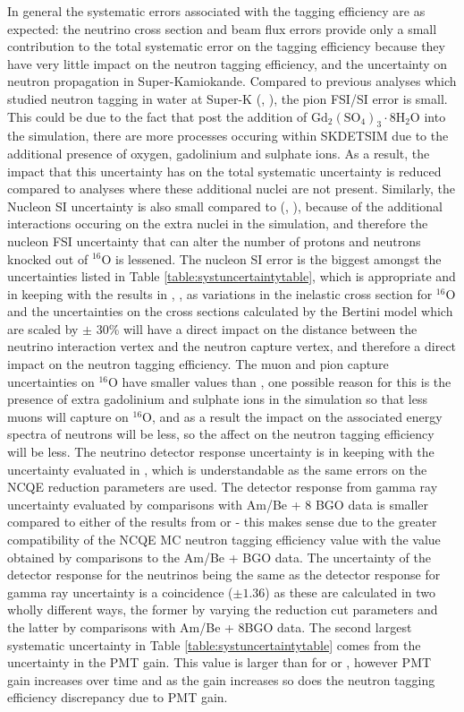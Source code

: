 In general the systematic errors associated with the tagging efficiency are as expected: the neutrino cross section and beam flux errors provide only a small contribution to the total systematic error on the tagging efficiency because they have very little impact on the neutron tagging efficiency, and the uncertainty on neutron propagation in Super-Kamiokande. Compared to previous analyses which studied neutron tagging in water at Super-K (\cite{tn415_fiacob}, \cite{akutsu_thesis}), the pion FSI/SI error is small. This could be due to the fact that post the addition of $\mathrm{Gd}_{2}\left(\mathrm{SO}_{4}\right)_{3} \cdot 8 \mathrm{H}_{2} \mathrm{O}$ into the simulation, there are more processes occuring within SKDETSIM due to the additional presence of oxygen, gadolinium and sulphate ions. As a result, the impact that this uncertainty has on the total systematic uncertainty is reduced compared to analyses where these additional nuclei are not present. Similarly, the Nucleon SI uncertainty is also small compared to (\cite{tn415_fiacob}, \cite{akutsu_thesis}), because of the additional interactions occuring on the extra nuclei in the simulation, and therefore the nucleon FSI uncertainty that can alter the number of protons and neutrons knocked out of ${ }^{16} \mathrm{O}$ is lessened. The nucleon SI error is the biggest amongst the uncertainties listed in Table \ref{table:systuncertaintytable}, which is appropriate and in keeping with the results in \cite{tn415_fiacob}, \cite{akutsu_thesis}, as variations in the inelastic cross section for ${ }^{16} \mathrm{O}$ and the uncertainties on the cross sections calculated by the Bertini model which are scaled by $\pm$ 30\% will have a direct impact on the distance between the neutrino interaction vertex and the neutron capture vertex, and therefore a direct impact on the neutron tagging efficiency. The muon and pion capture uncertainties on ${ }^{16} \mathrm{O}$ have smaller values than \cite{akutsu_thesis}, one possible reason for this is the presence of extra gadolinium and sulphate ions in the simulation so that less muons will capture on ${ }^{16} \mathrm{O}$, and as a result the impact on the associated energy spectra of neutrons will be less, so the affect on the neutron tagging efficiency will be less. The neutrino detector response uncertainty is in keeping with the uncertainty evaluated in \cite{tn415_fiacob}, which is understandable as the same errors on the NCQE reduction parameters are used. The detector response from gamma ray uncertainty evaluated by comparisons with Am/Be + 8 BGO data is smaller compared to either of the results from \cite{tn415_fiacob} or \cite{akutsu_thesis} - this makes sense due to the greater compatibility of the NCQE MC neutron tagging efficiency value with the value obtained by comparisons to the Am/Be + BGO data. The uncertainty of the detector response for the neutrinos being the same as the detector response for gamma ray uncertainty is a coincidence ($\pm 1.36$) as these are calculated in two wholly different ways, the former by varying the reduction cut parameters and the latter by comparisons with Am/Be + 8BGO data. The second largest systematic uncertainty in Table \ref{table:systuncertaintytable} comes from the uncertainty in the PMT gain. This value is larger than for \cite{tn415_fiacob} or \cite{akutsu_thesis}, however PMT gain increases over time and as the gain increases so does the neutron tagging efficiency discrepancy due to PMT gain.